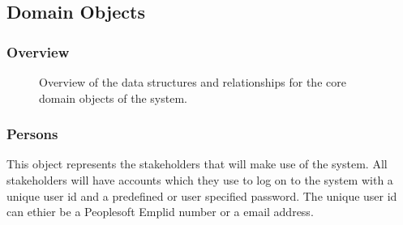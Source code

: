 \documentclass[12pt]{article}
\begin{document}

\subsection{Domain Objects} %
\subsubsection{Overview}

\begin{figure}[H]
\centering	
{}
\caption{Overview of the data structures and relationships for the core domain objects of the
system.}
\end{figure}

\newpage
\subsubsection{Persons}
This object represents the stakeholders that will make use of the system. All stakeholders will have accounts which they use to log on to the system with a unique user id and a predefined or user specified password. The unique user id can ethier be a Peoplesoft Emplid number or a email address.
\end{document}
